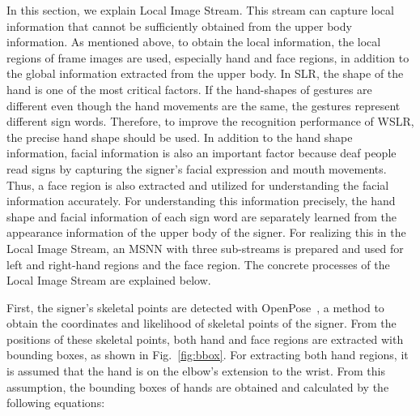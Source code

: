 \documentclass[journal]{IEEEtran}
\begin{document}
In this section, we explain Local Image Stream. 
This stream can capture local information that cannot be sufficiently obtained from the upper body information. 
As mentioned above, to obtain the local information, the local regions of frame images are used, 
especially hand and face regions, in addition to the global information extracted from the upper body. 
In SLR, the shape of the hand is one of the most critical factors. 
If the hand-shapes of gestures are different even though the hand movements are the same, 
the gestures represent different sign words. 
Therefore, to improve the recognition performance of WSLR, the precise hand shape should be used. 
In addition to the hand shape information, facial information is also an important factor 
because deaf people read signs by capturing the signer's facial expression and mouth movements. 
Thus, a face region is also extracted and utilized for understanding the facial information accurately. 
For understanding this information precisely, 
the hand shape and facial information of each sign word are separately 
learned from the appearance information of the upper body of the signer. 
For realizing this in the Local Image Stream, 
an MSNN with three sub-streams is prepared and used for left and right-hand regions and the face region. 
The concrete processes of the Local Image Stream are explained below. 

First, the signer's skeletal points are detected with OpenPose~\cite{cao2017openpose}, 
a method to obtain the coordinates and likelihood of skeletal points of the signer. 
From the positions of these skeletal points, 
both hand and face regions are extracted with bounding boxes, as shown in Fig.~\ref{fig:bbox}. 
For extracting both hand regions, it is assumed that the hand is on the elbow's extension to the wrist. 
From this assumption, the bounding boxes of hands are obtained and calculated by the following equations:
\end{document}
